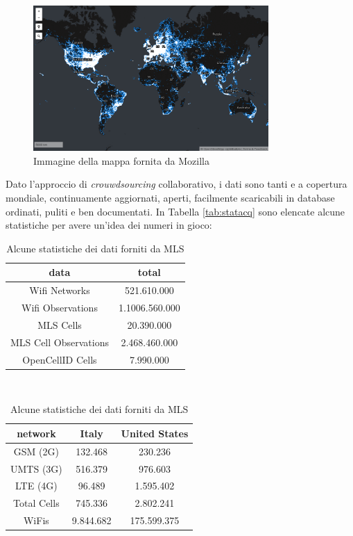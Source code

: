 \begin{figure}[b!]
	\centering
	\includegraphics[width=0.8\textwidth]{./Immagini/Dati/MLSmap.png}
	\caption{Immagine della mappa fornita da Mozilla}
	\label{fig:wapp}
\end{figure}

Dato l'approccio di \emph{crouwdsourcing} collaborativo, i dati sono tanti e a copertura mondiale, continuamente aggiornati, aperti, facilmente scaricabili in database ordinati, puliti e ben documentati. In Tabella \ref{tab:statacq} sono elencate alcune statistiche per avere un'idea dei numeri in gioco:
\begin{table}[t]
\centering
\caption{Alcune statistiche dei dati forniti da MLS}
\parbox{0.45\textwidth}{
\centering
	\begin{tabular}{cc}
	\toprule
	data 				&total\\
	\midrule
	Wifi Networks 			&521.610.000\\
	Wifi Observations 		&1.1006.560.000\\
	MLS Cells 			&20.390.000\\
	MLS Cell Observations 	&2.468.460.000\\
	OpenCellID Cells 		&7.990.000\\
	\midrule
	\end{tabular}
\label{tab:statacq}
}
\\
\parbox{0.45\textwidth}{
\centering
	\begin{tabular}{ccc}
	network 		&Italy 		&United States\\
	\midrule
	GSM (2G) 		&132.468 		&230.236\\
	UMTS (3G) 	&516.379 		&976.603\\
	LTE (4G) 		&96.489 		&1.595.402\\
	Total Cells 	&745.336 		&2.802.241\\
	WiFis 		&9.844.682 	&175.599.375\\
	\bottomrule
	\end{tabular}
\label{tab:statreg}
}
\label{tab:expectedfluoZnSe}
\end{table}

